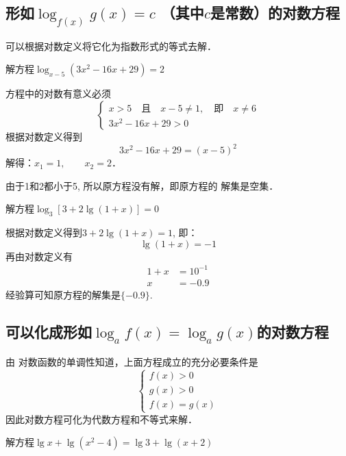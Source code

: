 \subsection{形如$\log_{f(x)}g(x)=c$\; （其中$c$是常数）的对数方程}

可以根据对数定义将它化为指数形式的等式去解．



\begin{example}
    解方程$\log_{x-5}(3x^2-16x+29)=2$
\end{example}

\begin{solution}
  方程中的对数有意义必须
  \[\begin{cases}
    x>5\quad\text{且}\quad  x-5\ne 1,\quad\text{即}\quad x\ne 6 \\
    3x^2-16x+29>0
  \end{cases}\] 
  根据对数定义得到
 \[ 3x^2-16x+29=(x-5)^2\]
  解得：$x_1=1,\qquad x_2=2$．

  由于1和2都小于5, 所以原方程没有解，即原方程的
  解集是空集．
\end{solution}


\begin{example}
    解方程$\log_3[3+2\lg(1+x)]=0$
\end{example}

\begin{solution}
  根据对数定义得到$3+2\lg(1+x)=1$,
  即：
  \[  \lg(1+x)=-1\]
  再由对数定义有
\[\begin{split}
  1+x&=10^{-1}\\
  x&=-0.9
\end{split}\]  
  经验算可知原方程的解集是$\{-0.9\}$.
\end{solution}

\subsection{可以化成形如$\log_a f(x)=\log_a g(x)$的对数方程}

由
对数函数的单调性知道，上面方程成立的充分必要条件是
\[\begin{cases}
  f(x)>0\\
  g(x)>0\\
  f(x)=g(x)
\end{cases}\]
因此对数方程可化为代数方程和不等式来解．

\begin{example}
  解方程$\lg x+\lg(x^2-4)=\lg3+\lg(x+2)$
\end{example}

